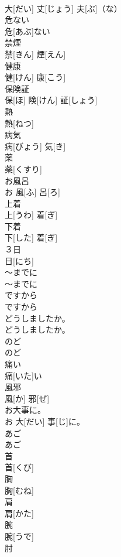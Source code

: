 \documentclass[8pt]{extreport}
\begin{document}
\begin{CJK}{UTF8}{min}
\\	大[だい] 丈[じょう] 夫[ぶ]（な）		
\\	危ない	
\\	危[あぶ]ない		
\\	禁煙	
\\	禁[きん] 煙[えん]		
\\	健康	
\\	健[けん] 康[こう]		
\\	保険証	
\\	保[ほ] 険[けん] 証[しょう]		
\\	熱	
\\	熱[ねつ]		
\\	病気	
\\	病[びょう] 気[き]		
\\	薬	
\\	薬[くすり]		
\\	お風呂	
\\	お 風[ふ] 呂[ろ]		
\\	上着	
\\	上[うわ] 着[ぎ]		
\\	下着	
\\	下[した] 着[ぎ]		
\\	３日	
\\	日[にち]		
\\	～までに	
\\	〜までに		
\\	ですから	
\\	ですから		
\\	どうしましたか。	
\\	どうしましたか。		
\\	のど	
\\	のど		
\\	痛い	
\\	痛[いた]い		
\\	風邪	
\\	風[か] 邪[ぜ]		
\\	お大事に。	
\\	お 大[だい] 事[じ]に。		
\\	あご	
\\	あご		
\\	首	
\\	首[くび]		
\\	胸	
\\	胸[むね]		
\\	肩	
\\	肩[かた]		
\\	腕	
\\	腕[うで]		
\\	肘	

\end{CJK}
\end{document}
